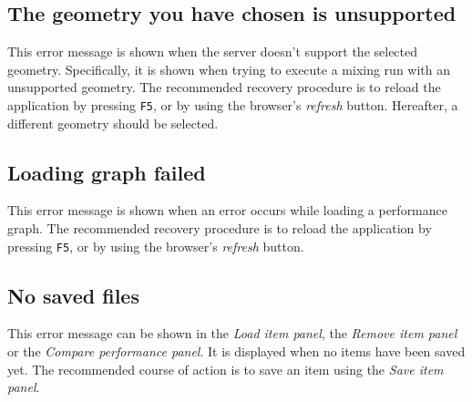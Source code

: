 \subsection{The geometry you have chosen is unsupported}
This error message is shown when the server doesn't support the selected geometry. Specifically, it is shown when trying to execute a mixing run with an unsupported geometry. The recommended recovery procedure is to reload the application by pressing \texttt{F5}, or by using the browser's \emph{refresh} button. Hereafter, a different geometry should be selected.

\subsection{Loading graph failed}
This error message is shown when an error occurs while loading a performance graph. The recommended recovery procedure is to reload the application by pressing \texttt{F5}, or by using the browser's \emph{refresh} button.

\subsection{No saved files}
This error message can be shown in the \emph{Load item panel}, the \emph{Remove item panel} or the \emph{Compare performance panel}. It is displayed when no items have been saved yet. The recommended course of action is to save an item using the \emph{Save item panel}.